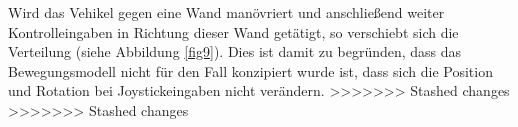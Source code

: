 \documentclass{../Vorlage/mat}
\begin{document}
Wird das Vehikel gegen eine Wand manövriert und anschließend weiter Kontrolleingaben in Richtung dieser Wand getätigt, so verschiebt sich die Verteilung (siehe Abbildung \ref{fig9}). Dies ist damit zu begründen, dass das Bewegungsmodell nicht für den Fall konzipiert wurde ist, dass sich die Position und Rotation bei Joystickeingaben nicht verändern.
>>>>>>> Stashed changes
>>>>>>> Stashed changes
\end{document}
